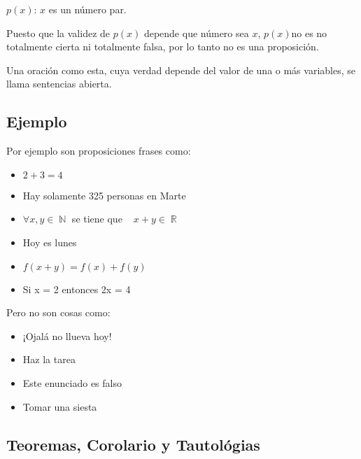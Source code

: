 \documentclass[12pt]{report}                                    %
\DeclareMathOperator \Space {\quad}                             %
\DeclareMathOperator \MiniSpace {\;}                            %
\DeclareMathOperator \Naturals {\mathbb{N}}                     %
\DeclareMathOperator \Reals {\mathbb{R}}                        %
\begin{document}
            $p(x)$: $x$ es un número par.

            Puesto que la validez de $p(x)$ depende que número sea $x$, $p(x)$no es no totalmente cierta ni
            totalmente falsa, por lo tanto no es una proposición.

            Una oración como esta, cuya verdad depende del valor de una o más variables,
            se llama sentencias abierta.



            \clearpage
            \subsection*{Ejemplo}


                Por ejemplo son proposiciones frases como:
                \begin{itemize}
                    \item $2 + 3 = 4$
                    \item Hay solamente 325 personas en Marte
                    \item $\forall x, y \in \Naturals$ se tiene que $\MiniSpace x+y \in \Reals$
                    \item Hoy es lunes
                    \item $f(x+y) = f(x) + f(y)$
                    \item Si x = 2 entonces 2x = 4
                \end{itemize}

                Pero no son cosas como:
                \begin{itemize}
                    \item ¡Ojalá no llueva hoy!
                    \item Haz la tarea
                    \item Este enunciado es falso
                    \item Tomar una siesta
                \end{itemize}



        \clearpage
        \subsection{Teoremas, Corolario y Tautológias}
            
\end{document}
